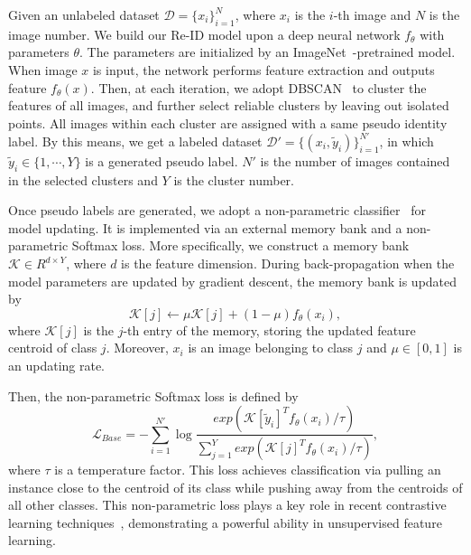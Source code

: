 \documentclass[letterpaper]{article} %
\begin{document}
Given an unlabeled dataset $\mathcal{D} = \{x_i\}_{i=1}^{N}$, where $x_i$ is the $i$-th image and $N$ is the image number. We build our Re-ID model upon a deep neural network $f_\theta$ with parameters $\theta$. The parameters are initialized by an ImageNet~\cite{krizhevsky2012imagenet}-pretrained model. When image $x$ is input, the network performs feature extraction and outputs feature $f_\theta(x)$. Then, at each iteration, we adopt DBSCAN~\cite{ester1996density} to cluster the features of all images, and further select reliable clusters by leaving out isolated points. All images within each cluster are assigned with a same pseudo identity label. By this means, we get a labeled dataset $\mathcal{D}' = \{(x_i, \tilde{y}_i)\}_{i=1}^{N'}$, in which $\tilde{y}_i \in \{1, \cdots, Y\}$ is a generated pseudo label. $N'$ is the number of images contained in the selected clusters and $Y$ is the cluster number. %


Once pseudo labels are generated, we adopt a non-parametric classifier~\cite{wu2018memory} for model updating. It is implemented via an external memory bank and a non-parametric Softmax loss. More specifically, we construct a memory bank $\mathcal{K}\in R^{d \times Y}$, where $d$ is the feature dimension. During back-propagation when the model parameters are updated by gradient descent, the memory bank is updated by
\begin{equation}
	\mathcal{K}[j] \leftarrow \mu \mathcal{K}[j] + (1 - \mu) f_\theta(x_i),
	\label{eq:mu}
\end{equation}
where $\mathcal{K}[j]$ is the $j$-th entry of the memory, storing the updated feature centroid of class $j$. Moreover, $x_i$ is an image belonging to class $j$ and $\mu \in [0,1]$ is an updating rate.

Then, the non-parametric Softmax loss is defined by
\begin{equation}
\mathcal{L}_{Base} = - \sum_{i=1}^{N'} \log \frac{exp(\mathcal{K}[\tilde{y}_i]^T f_\theta(x_i)/\tau)}{\sum_{j=1}^{Y} exp(\mathcal{K}[j]^T f_\theta(x_i)/\tau)},
\label{eq_base_loss}
\end{equation}
where $\tau$ is a temperature factor. This loss achieves classification via pulling an instance close to the centroid of its class while pushing away from the centroids of all other classes. This non-parametric loss plays a key role in recent contrastive learning techniques~\cite{wu2018memory,zhong2019invariance,Chen2020SimCLR,he2019momentum}, demonstrating a powerful ability in unsupervised feature learning.
\end{document}

